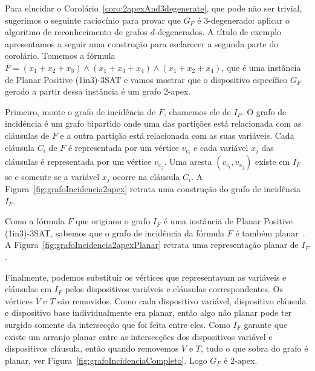 Para elucidar o Corolário~\ref{coro:2apexAnd3degenerate}, que pode não ser trivial, sugerimos o seguinte raciocínio para provar que $G_F$ é 3-degenerado: aplicar o algoritmo de reconhecimento de grafos $d$-degenerados. A título de exemplo apresentamos a seguir uma construção para esclarecer a segunda parte do corolário. Tomemos a fórmula $F=(x_1+x_2+x_3)\wedge(x_1+x_3+x_4)\wedge(x_1+x_2+x_4)$, que  é uma instância de {\sc Planar Positive (1in3)-3SAT} e vamos mostrar que o dispositivo específico $G_F$ gerado a partir dessa instância é um grafo 2-apex.

Primeiro, monte o grafo de incidência de $F$, chamemos ele de $I_F$. O grafo de incidência é um grafo bipartido onde uma das partições está relacionada com as cláusulas de $F$ e a outra partição está relacionada com as suas variáveis. Cada cláusula $C_i$ de $F$ é representada por um vértice $v_{c_i}$ e cada variável $x_j$ das cláusulas é representada por um vértice $v_{x_j}$. Uma aresta  $(v_{c_i}, v_{x_j})$ existe em $I_F$ se e somente se a variável $x_j$ ocorre na cláusula $C_i$. A Figura~\ref{fig:grafoIncidencia2apex} retrata uma construção do grafo de incidência $I_F$.



Como a fórmula $F$ que originou o grafo $I_F$ é uma instância de {\sc Planar Positive (1in3)-3SAT}, sabemos que o grafo de incidência da fórmula  $F$ é também planar~\cite{mulzer2008minimum}. A Figura~\ref{fig:grafoIncidencia2apexPlanar} retrata uma representação planar de $I_F$.




Finalmente, podemos substituir os vértices que representavam as variáveis e cláusulas em $I_F$ pelos dispositivos variáveis e cláusulas correspondentes. Os vértices $V$ e $T$ são removidos. Como cada dispositivo variável, dispositivo cláusula e dispositivo base individualmente era planar, então algo não planar pode ter surgido somente da intersecção que foi feita entre eles. Como $I_F$ garante que existe um arranjo planar entre as intersecções dos dispositivos variável e dispositivos cláusula, então quando removemos $V$ e $T$, tudo o que sobra do grafo é planar, ver Figura~\ref{fig:grafoIncidenciaCompleto}. Logo $G_F$ é 2-apex.


